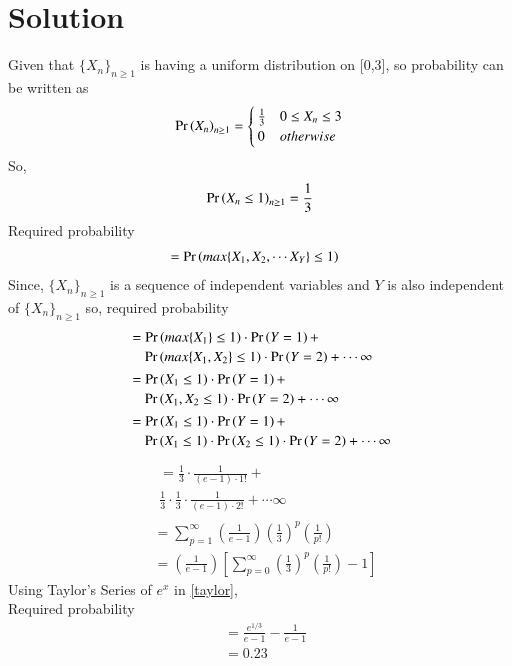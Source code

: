 \documentclass[journal,12pt,twocolumn]{IEEEtran}
\begin{document}
\section{Solution}
Given that $\{X_n\}_{n\ge 1}$ is having a uniform distribution on [0,3], so probability can be written as
\begin{align}
\Pr\left(X_n\right)_{n\ge 1}=  
\begin{cases}
\frac{1}{3} & 0\le X_n\le 3 \\
0 & otherwise
\end{cases}
\end{align}
So,
\begin{align}
    \Pr\left(X_n\le 1\right)_{n\ge 1}=\frac{1}{3}
\end{align}
Required probability
\begin{align}
 &=\Pr\left(max\{X_1,X_2,\cdots X_Y\}\le 1\right)
 \end{align}
 Since, $\{X_n\}_{n\ge 1}$ is a sequence of independent variables and $Y$ is also independent of $\{X_n\}_{n\ge 1}$ so, required probability
 \begin{align}
& \begin{multlined}
    =\pr{max\{X_1\}\le 1}\cdot \pr{Y=1}+\\
    \pr{max\{X_1,X_2\}\le 1}\cdot \pr{Y=2}+\cdots \infty 
\end{multlined}\\
&\begin{multlined}
    =\pr{X_1\le 1}\cdot \pr{Y=1}+\\
    \pr{X_1,X_2\le 1}\cdot\pr{Y=2}+\cdots \infty
\end{multlined}\\
&\begin{multlined}
    =\pr{X_1\le 1}\cdot \pr{Y=1}+\\
    \pr{X_1\le 1}\cdot\pr{X_2\le 1}\cdot\pr{Y=2}+\cdots \infty
\end{multlined}
\end{align}
\begin{align}
&\begin{multlined}
=\frac{1}{3}\cdot\frac{1}{(e-1)\cdot 1!}+\\
\frac{1}{3}\cdot \frac{1}{3}\cdot\frac{1}{(e-1)\cdot 2!}+\cdots \infty
\end{multlined}\\
&=\sum_{p=1}^{\infty}\left(\frac{1}{e-1}\right)\left(\frac{1}{3}\right)^p\left(\frac{1}{p!}\right)\\
&=\left(\frac{1}{e-1}\right)\left[\sum_{p=0}^{\infty}\left(\frac{1}{3}\right)^p\left(\frac{1}{p!}\right)-1\right]\label{taylor}
\end{align}
Using Taylor's Series of $e^x$ in \eqref{taylor}, \\
Required probability
\begin{align}
    &=\frac{e^{1/3}}{e-1}-\frac{1}{e-1}\\
    &=0.23
\end{align}
    
\end{document}
